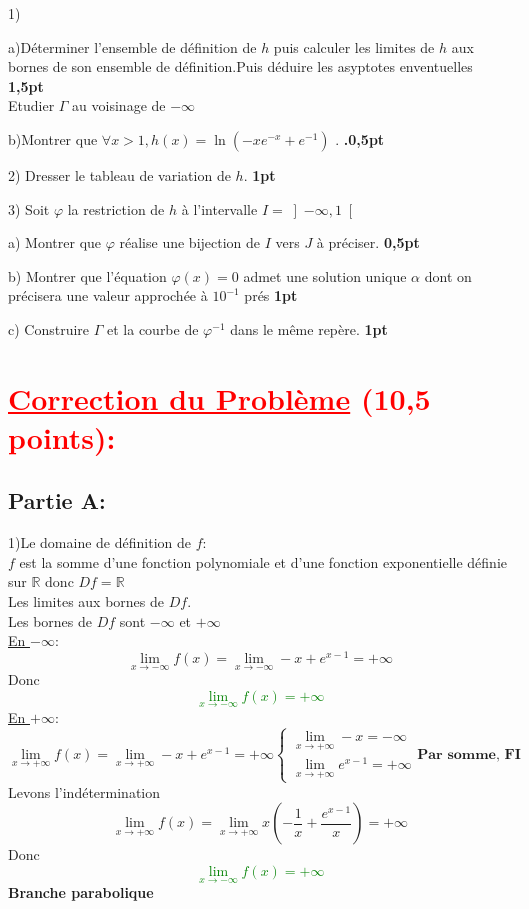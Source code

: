 \documentclass[12pt]{article}
\begin{document}
1)

	a)Déterminer l’ensemble de définition de $h$ puis calculer les limites de $h$ aux bornes de son ensemble de définition.Puis déduire les asyptotes enventuelles \textbf{1,5pt}\\
Etudier $\Gamma$ au voisinage de $-\infty$

	b)Montrer que $\forall x>1, h(x)=\ln(-xe^{-x}+e^{-1}) $ . \textbf{.0,5pt}
	
2) Dresser le tableau de variation de  $h$.   \textbf{1pt}
    
3) Soit $\varphi$ la restriction de $h$ à l’intervalle $I=\left]-\infty, 1\right[ $
    
    a) Montrer que $\varphi$  réalise une bijection de $I$ vers $J$  à préciser.
    \textbf{0,5pt}
        
    b) Montrer que l’équation $\varphi(x)=0$ admet une solution unique $\alpha$ dont on précisera une valeur approchée à $10^{-1}$ prés   \textbf{1pt}
    
    c) Construire $\Gamma$ et la courbe de $\varphi^{-1}$  dans le même repère.  \textbf{1pt}
\section*{\textcolor{red}{\underline{Correction du Problème} (10,5 points):}}
\subsection*{Partie A:}
1)Le domaine de définition de $f$:\\
$f$ est la somme d'une fonction polynomiale et d'une fonction exponentielle définie sur $\mathbb{R}$ donc $Df=\mathbb{R}$\\
Les limites aux bornes de $Df$.\\
Les bornes de $Df$ sont $-\infty$ et $+\infty$\\
\underline{En $-\infty$}:
\[\lim_{x \to -\infty}f(x)=\lim_{x \to -\infty}-x+e^{x-1}=+\infty\]
Donc \textcolor{green}{\[\lim_{x \to -\infty}f(x)=+\infty\]}
\underline{En $+\infty$}:
\begin{equation*}
\lim_{x \to +\infty}f(x)=\lim_{x \to +\infty}-x+e^{x-1}=+\infty
\begin{cases}
\lim_{x \to +\infty} -x=-\infty\\
\lim_{x \to +\infty}e^{x-1}=+\infty
\end{cases}
\textbf{Par somme, FI}
\end{equation*}
Levons l'indétermination\\
\begin{equation*}
\lim_{x \to +\infty}f(x)=\lim_{x \to +\infty}x\left(-\frac{1}{x}+\frac{e^{x-1}}{x}\right)=+\infty
\end{equation*}
Donc \textcolor{green}{\[\lim_{x \to -\infty}f(x)=+\infty\]}
\textbf{Branche parabolique}
 
\end{document}

